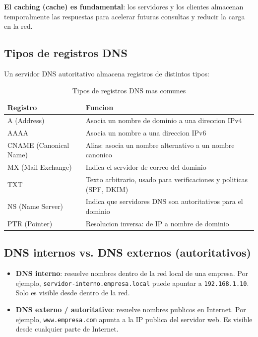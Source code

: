 \textbf{El caching (cache) es fundamental}: los servidores y los clientes
almacenan temporalmente las respuestas para acelerar futuras consultas y
reducir la carga en la red.

\subsection{Tipos de registros DNS}

Un servidor DNS autoritativo almacena registros de distintos tipos:

\begin{table}[htbp]
\centering
\small
\caption{Tipos de registros DNS mas comunes}
\begin{tabularx}{\textwidth}{@{}l>{\raggedright\arraybackslash}X@{}}
\toprule
\textbf{Registro} & \textbf{Funcion} \\
\midrule
A (Address) & Asocia un nombre de dominio a una direccion IPv4 \\
AAAA & Asocia un nombre a una direccion IPv6 \\
CNAME (Canonical Name) & Alias: asocia un nombre alternativo a un nombre canonico \\
MX (Mail Exchange) & Indica el servidor de correo del dominio \\
TXT & Texto arbitrario, usado para verificaciones y politicas (SPF, DKIM) \\
NS (Name Server) & Indica que servidores DNS son autoritativos para el dominio \\
PTR (Pointer) & Resolucion inversa: de IP a nombre de dominio \\
\bottomrule
\end{tabularx}
\end{table}

\subsection{DNS internos vs. DNS externos (autoritativos)}

\begin{itemize}
    \item \textbf{DNS interno}: resuelve nombres dentro de la red local de una
    empresa. Por ejemplo, \texttt{servidor-interno.empresa.local} puede apuntar a
    \texttt{192.168.1.10}. Solo es visible desde dentro de la red.
    \item \textbf{DNS externo / autoritativo}: resuelve nombres publicos en
    Internet. Por ejemplo, \texttt{www.empresa.com} apunta a la IP publica del
    servidor web. Es visible desde cualquier parte de Internet.
\end{itemize}

